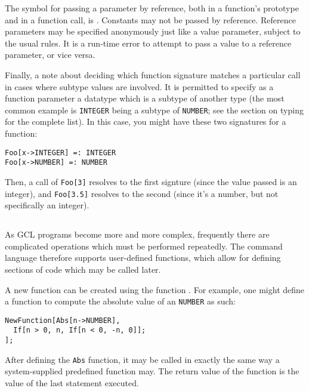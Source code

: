 The symbol for passing a parameter by reference, both in a function's
prototype and in a function call, is {\tt <->}.  Constants may not be
passed by reference.  Reference parameters may be specified
anonymously just like a value parameter, subject to the usual rules.
It is a run-time error to attempt to pass a value to a reference
parameter, or vice versa.

Finally, a note about deciding which function signature matches a particular
call in cases where subtype values are involved.  It is permitted to 
specify as a function parameter a datatype which is a subtype of another
type (the most common example is \verb+INTEGER+ being a subtype of
\verb+NUMBER+; see the section on typing for the complete list).  In this case,
you might have these two signatures for a function:

\begin{verbatim}
Foo[x->INTEGER] =: INTEGER
Foo[x->NUMBER] =: NUMBER
\end{verbatim}

Then, a call of \verb+Foo[3]+ resolves to the first signture (since the
value passed is an integer), and \verb+Foo[3.5]+ resolves to the second
(since it's a number, but not specifically an integer).

\subsection{}

As GCL programs become more and more complex, frequently there are
complicated operations which must be performed repeatedly.  The
command language therefore supports user-defined functions, which
allow for defining sections of code which may be called later.

A new function can be created using the function .
For example, one might define a function to compute the absolute value
of an {\tt NUMBER} as such:

\begin{verbatim}
NewFunction[Abs[n->NUMBER],
  If[n > 0, n, If[n < 0, -n, 0]];
];
\end{verbatim}

\noindent After defining the \verb+Abs+ function, it may be called in
exactly the same way a system-supplied predefined function may.  The
return value of the function is the value of the last statement
executed.

